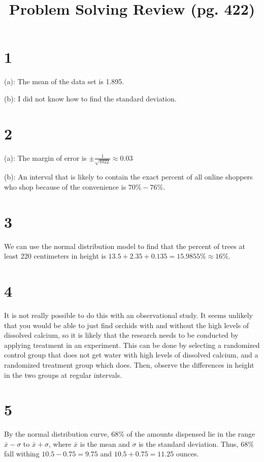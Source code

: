 \documentclass{article}
\title{Problem Solving Review (pg. 422)}
\theoremstyle{definition}
\newcommand{\?}{\stackrel{?}{=}}
\begin{document}
\maketitle

\section*{1}
(a): The mean of the data set is 1.895.

(b): I did not know how to find the standard deviation.

\section*{2}
(a): The margin of error is $\pm\frac{1}{\sqrt{1022}}\approx 0.03$


(b): An interval that is likely to contain the exact percent of all online shoppers who shop because of the convenience is 
$70\%-76\%$.

\section*{3}
We can use the normal distribution model to find that the percent of trees at least 220 centimeters in height is $13.5+2.35+0.135=15.9855\%\approx 16\%$. 

\section*{4}
It is not really possible to do this with an observational study. It seems unlikely that you would be able to just find orchids with and without the high levels of 
dissolved calcium, so it is likely that the research needs to be conducted by applying treatment in an experiment. 
This can be done by selecting a randomized control group that does not 
get water with high levels of dissolved calcium, and a randomized treatment group which does. Then, observe the differences in height in the two groups at regular intervals.

\section*{5}
By the normal distribution curve, 
68\% of the amounts dispensed lie in the range $\bar{x}-\sigma$ to $\bar{x}+\sigma$, where $\bar{x}$ is the mean and $\sigma$ is the standard deviation. Thus, 
$68\%$ fall withing $10.5-0.75=9.75$ and $10.5+0.75=11.25$ ounces.
\end{document}
